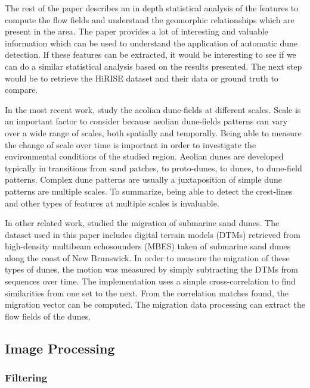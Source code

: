The rest of the paper describes an in depth statistical analysis of the features to compute the flow fields and understand the geomorphic relationships which are present in the area. The paper \cite{Ewing_Peyret_Kocurek_Bourke} provides	a lot of interesting and valuable information which can be used to understand the application of automatic dune detection. If these features can be extracted, it would be interesting to see if we can do a similar statistical analysis based on the results presented. The next step would be to retrieve the HiRISE dataset and their data or ground truth to compare.

In the most recent work, \cite{Multi_spatial_analysis_aeolian_dune_field_patterns} study the aeolian dune-fields at different scales. Scale is an important factor to consider because aeolian dune-fields patterns can vary over	a wide range of scales, both spatially and temporally. Being able to measure the change of scale over time is important in order to investigate the environmental conditions of the studied region. Aeolian	dunes are developed typically in transitions from sand patches, to proto-dunes, to dunes, to dune-field patterns. Complex dune patterns are usually a juxtaposition of simple dune patterns are multiple scales. To summarize, being able to detect the crest-lines and other types of features at multiple scales is invaluable.

In other related work, \cite{Application_spatial_cross_correlation_detection_submarine_dunes} studied the migration of submarine sand dunes. The dataset used in this paper includes digital terrain models (DTMs) retrieved from high-density multibeam echosounders (MBES) taken of submarine sand dunes along the coast of New Brunswick. In order to measure the migration of these types of dunes, the motion was measured by simply subtracting the 	DTMs from sequences over time. The implementation uses a simple cross-correlation to find similarities from one set to the next. From the correlation matches found, the migration vector can be computed. The migration data processing can extract the flow fields of the dunes.

\subsection{Image Processing}

\subsubsection{Filtering}

